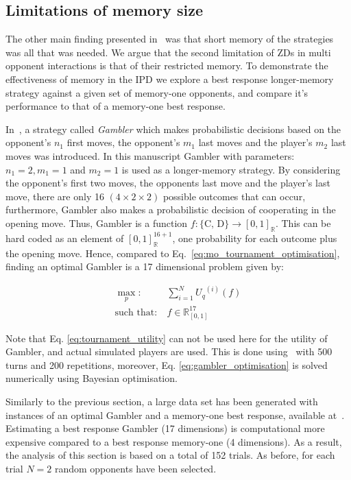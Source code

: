 \documentclass[10pt]{article}
\newcommand{\R}{\mathbb{R}}
\begin{document}
\subsection{Limitations of memory size}

The other main finding presented in~\cite{Press2012} was that
short memory of the strategies was all that was needed.
We argue that the second limitation of ZDs in multi opponent
interactions is that of their restricted memory.
To demonstrate the effectiveness of memory in the IPD we explore a best response
longer-memory strategy against a given set of memory-one opponents,  and compare
it's performance to that of a memory-one best response.

In~\cite{Harper2017}, a strategy called \textit{Gambler} which makes
probabilistic decisions based on the opponent's \(n_1\) first moves, the
opponent's \(m_1\) last moves and the player's \(m_2\) last moves was
introduced. In this manuscript Gambler with parameters: $n_1 = 2, m_1 = 1$ and $m_2 = 1$ is used
as a longer-memory strategy.
By considering the opponent's first two moves, the opponents last move and the
player's last move, there are only 16 $(4 \times 2 \times 2)$ possible outcomes
that can occur, furthermore, Gambler also makes a probabilistic decision of
cooperating in the opening move. Thus, Gambler is a function \(f: \{\text{C,
D}\} \rightarrow [0, 1]_{\R}\). This can be hard coded as an element
of \([0, 1]_{\R} ^ {16 + 1}\), one probability for each outcome plus the opening
move. Hence, compared to Eq.~\ref{eq:mo_tournament_optimisation}, finding an
optimal Gambler is a 17 dimensional problem given by:

\begin{equation}\label{eq:gambler_optimisation}
    \begin{aligned}
    \max_p: & \ \sum_{i=1} ^ {N} {U_q}^{(i)} (f)
    \\
    \text{such that}: & \ f \in \R_{[0, 1]}^{17}
    \end{aligned}
\end{equation}

Note that Eq. \ref{eq:tournament_utility} can not be used here for the utility
of Gambler, and actual simulated players are used. This is done using~\cite{axelrodproject}
with 500 turns and 200 repetitions, moreover, Eq. \ref{eq:gambler_optimisation}
is solved numerically using Bayesian optimisation.

Similarly to the previous section, a large data set has been generated with
instances of an optimal Gambler and a memory-one best response, available
at~\cite{glynatsi2019}. Estimating a best response Gambler (17 dimensions) is
computational more expensive compared to a best response memory-one (4
dimensions). As a result, the analysis of this section is based on a total of
152 trials. As before, for each trial \(N=2\) random opponents have been selected.
\end{document}
